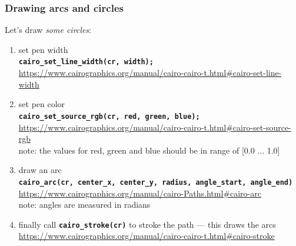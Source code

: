 \documentclass[aspectratio=169]{beamer}
\newcommand{\greenemph}[1]{\textit{\textcolor{clGreen}{#1}}}
\newcommand{\cppmethod}[1]{\texttt{\textbf{\textcolor{clCodeBlue}{#1}}}}
\begin{document}
\begin{frame}[fragile]
\frametitle{Drawing arcs and circles}
{\large Let's draw \greenemph{some circles}:}
\vspace{3mm}
  \begin{enumerate}
    \item set pen width\\
    \cppmethod{cairo\_set\_line\_width(cr, width);}\\
    \vspace{-5pt}
    {\tiny \url{https://www.cairographics.org/manual/cairo-cairo-t.html#cairo-set-line-width}}

    \item set pen color\\
    \cppmethod{cairo\_set\_source\_rgb(cr, red, green, blue);}\\
    \vspace{-5pt}
    {\tiny \url{https://www.cairographics.org/manual/cairo-cairo-t.html#cairo-set-source-rgb}}\\
    \vspace{-3pt}
    {\small note: the values for red, green and blue should be in range of [0.0 ... 1.0]}

    \item draw an arc\\
    {\small \cppmethod{cairo\_arc(cr, center\_x, center\_y, radius,  angle\_start, angle\_end)}}\\
    \vspace{-5pt}
    {\tiny \url{https://www.cairographics.org/manual/cairo-Paths.html#cairo-arc}}\\
    \vspace{-3pt}
    {\small note: angles are measured in radians}

    \item finally call \cppmethod{cairo\_stroke(cr)} to stroke the path --- this draws the arcs\\
    \vspace{-5pt}
    {\tiny \url{https://www.cairographics.org/manual/cairo-cairo-t.html#cairo-stroke}}
  \end{enumerate}
\end{frame}
\end{document}
